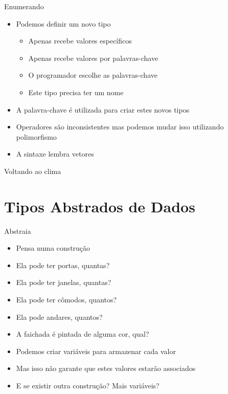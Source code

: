 \documentclass[14pt]{beamer}
\begin{document}
		\begin{frame}{Enumerando}
			\begin{itemize}
				\presentationPause\item Podemos definir um novo tipo
				\begin{itemize}
					\presentationPause\item Apenas recebe valores específicos
					\presentationPause\item Apenas recebe valores por palavras-chave
					\presentationPause\item O programador escolhe as palavras-chave
					\presentationPause\item Este tipo precisa ter um nome
				\end{itemize}
				\presentationPause\item A palavra-chave  é utilizada para criar estes novos tipos
				\presentationPause\item Operadores são inconsistentes \presentationPause mas podemos mudar isso utilizando polimorfismo
				\presentationPause\item A sintaxe lembra vetores
			\end{itemize}
			\presentationPause
		\end{frame}

		\begin{frame}{Voltando ao clima}
			\presentationPause
		\end{frame}
		
	\section{Tipos Abstrados de Dados}
		\begin{frame}{Abstraia}
			\begin{itemize}
				\presentationPause\item Pensa numa construção
				\presentationPause\item Ela pode ter portas\presentationPause, quantas?
				\presentationPause\item Ela pode ter janelas\presentationPause, quantas?
				\presentationPause\item Ela pode ter cômodos\presentationPause, quantos?
				\presentationPause\item Ela pode andares\presentationPause, quantos?
				\presentationPause\item A faichada é pintada de alguma cor\presentationPause, qual?
				\presentationPause\item Podemos criar variáveis para armazenar cada valor
				\presentationPause\item Mas isso não garante que estes valores estarão associados
				\presentationPause\item E se existir outra construção? \presentationPause Mais variáveis?
			\end{itemize}
		\end{frame}
\end{document}
